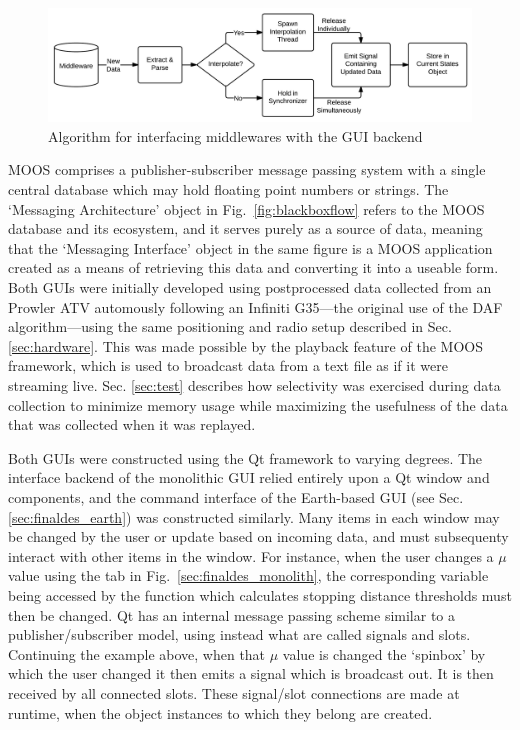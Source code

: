 \begin{figure}[ht] \centering 
    \includegraphics[width=5in]{./figs/middleware_diagram.png}
    \caption{Algorithm for interfacing middlewares with the GUI backend} \label{fig:midw_diagram}
\end{figure}

MOOS comprises a publisher-subscriber message passing system with a single central database which may hold floating point numbers or strings. The `Messaging Architecture' object in Fig.~\ref{fig:blackboxflow} refers to the MOOS database and its ecosystem, and it serves purely as a source of data, meaning that the `Messaging Interface' object in the same figure is a MOOS application created as a means of retrieving this data and converting it into a useable form.
Both GUIs were initially developed using postprocessed data collected from an Prowler ATV automously following an Infiniti G35---the original use of the DAF algorithm---using the same positioning and radio setup described in Sec. \ref{sec:hardware}. This was made possible by the playback feature of the MOOS framework, which is used to broadcast data from a text file as if it were streaming live.
Sec. \ref{sec:test} describes how selectivity was exercised during data collection to minimize memory usage while maximizing the usefulness of the data that was collected when it was replayed.

Both GUIs were constructed using the Qt \cite{qt} framework to varying degrees. The interface backend of the monolithic GUI relied entirely upon a Qt window and components, and the command interface of the Earth-based GUI (see Sec. \ref{sec:finaldes_earth}) was constructed similarly. Many items in each window may be changed by the user or update based on incoming data, and must subsequenty interact with other items in the window. For instance, when the user changes a $\mu$ value using the tab in Fig.~\ref{sec:finaldes_monolith}, the corresponding variable being accessed by the function which calculates stopping distance thresholds must then be changed. Qt has an internal message passing scheme similar to a publisher/subscriber model, using instead what are called signals and slots. Continuing the example above, when that $\mu$ value is changed the `spinbox' by which the user changed it then emits a signal which is broadcast out. It is then received by all connected slots. These signal/slot connections are made at runtime, when the object instances to which they belong are created.

